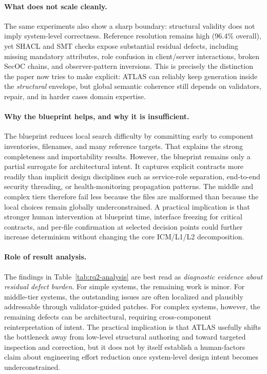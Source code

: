 \documentclass[acmlarge,nonacm]{acmart}
\theoremstyle{acmplain}
\theoremstyle{acmdefinition}
\begin{document}
\paragraph{What does not scale cleanly.}
The same experiments also show a sharp boundary: structural validity does not imply system-level correctness. Reference resolution remains high (96.4\% overall), yet SHACL and SMT checks expose substantial residual defects, including missing mandatory attributes, role confusion in client/server interactions, broken SecOC chains, and observer-pattern inversions. This is precisely the distinction the paper now tries to make explicit: ATLAS can reliably keep generation inside the \emph{structural} envelope, but global semantic coherence still depends on validators, repair, and in harder cases domain expertise.

\paragraph{Why the blueprint helps, and why it is insufficient.}
The blueprint reduces local search difficulty by committing early to component inventories, filenames, and many reference targets. That explains the strong completeness and importability results. However, the blueprint remains only a partial surrogate for architectural intent. It captures explicit contracts more readily than implicit design disciplines such as service-role separation, end-to-end security threading, or health-monitoring propagation patterns. The middle and complex tiers therefore fail less because the files are malformed than because the local choices remain globally underconstrained. A practical implication is that stronger human intervention at blueprint time, interface freezing for critical contracts, and per-file confirmation at selected decision points could further increase determinism without changing the core ICM/L1/L2 decomposition.

\paragraph{Role of result analysis.}
The findings in Table~\ref{tab:rq2-analysis} are best read as \emph{diagnostic evidence about residual defect burden}. For simple systems, the remaining work is minor. For middle-tier systems, the outstanding issues are often localized and plausibly addressable through validator-guided patches. For complex systems, however, the remaining defects can be architectural, requiring cross-component reinterpretation of intent. The practical implication is that ATLAS usefully shifts the bottleneck away from low-level structural authoring and toward targeted inspection and correction, but it does not by itself establish a human-factors claim about engineering effort reduction once system-level design intent becomes underconstrained.
\end{document}
